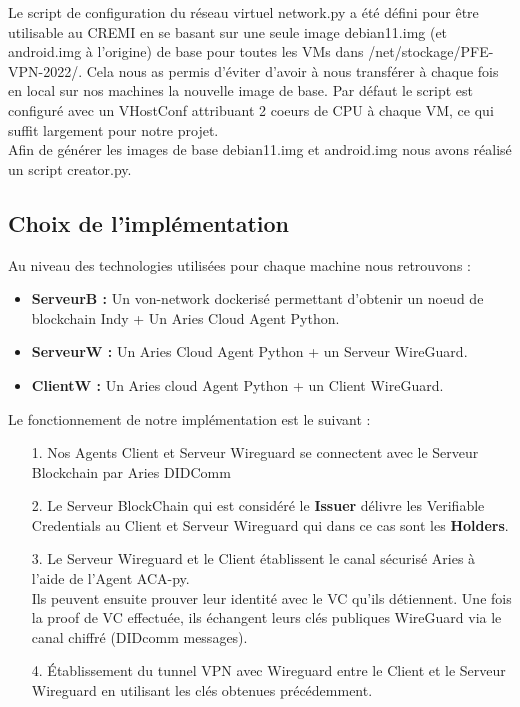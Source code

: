 \documentclass[12pt, openany]{report}
\begin{document}
\begin{flushleft}
Le script de configuration du réseau virtuel network.py a été défini pour être utilisable au CREMI en se basant sur une seule image debian11.img (et android.img à l'origine) de base pour toutes les VMs dans /net/stockage/PFE-VPN-2022/. Cela nous as permis d'éviter d'avoir à nous transférer à chaque fois en local sur nos machines la nouvelle image de base. Par défaut le script est configuré avec un VHostConf attribuant 2 coeurs de CPU à chaque VM, ce qui suffit largement pour notre projet.\\
Afin de générer les images de base debian11.img et android.img nous avons réalisé un script creator.py.

\subsection{Choix de l'implémentation}

Au niveau des technologies utilisées pour chaque machine nous retrouvons :\\
\begin{itemize}
\item \textbf{ServeurB :} Un von-network dockerisé permettant d'obtenir un noeud de blockchain Indy + Un Aries Cloud Agent Python.
\item \textbf{ServeurW :} Un Aries Cloud Agent Python + un Serveur WireGuard.
\item \textbf{ClientW :} Un Aries cloud Agent Python + un Client WireGuard.
\end{itemize}
Le fonctionnement de notre implémentation est le suivant : 

\begin{itemize}
\color{green}
\item[1.] \color{black} Nos Agents Client et Serveur Wireguard se connectent avec le Serveur Blockchain par Aries DIDComm

\color{orange}
\item[2.] \color{black} Le Serveur BlockChain qui est considéré le \textbf{Issuer} délivre les Verifiable Credentials au Client et Serveur Wireguard qui dans ce cas sont les \textbf{Holders}.

\color{violet}
\item[3.] \color{black} Le Serveur Wireguard et le Client établissent le canal sécurisé Aries à l’aide de l’Agent ACA-py.\\
Ils peuvent ensuite prouver leur identité avec le VC qu’ils détiennent.
Une fois la proof de VC effectuée, ils échangent leurs clés publiques WireGuard via le canal chiffré (DIDcomm messages).

\color{red}
\item[4.] \color{black} Établissement du tunnel VPN avec Wireguard entre le Client et le Serveur Wireguard en utilisant les clés obtenues précédemment.

\end{itemize}


\end{flushleft}
\end{document}
